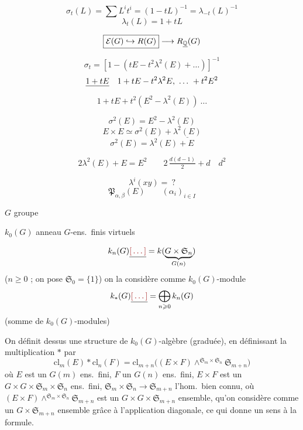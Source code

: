 \documentclass[11pt,a4paper]{article}
\begin{document}
\[
  \sigma_t(L) = \sum L^{i} t^{i} = (1 - tL)^{-1} = \lambda_{-t}(L)^{-1}
\]
\[
  \lambda_t(L) = 1 + tL
\]

\[
  \boxed{\mathcal{E}(G) \hookrightarrow R(G)} \longrightarrow R_{\uncertain{\mathbb{Q}}}(G)
\]

\[
  \sigma_t = [1 - (tE - t^{2}\lambda^{2}(E) + \ldots)]^{-1}
\]
\[
  \struck{1 + tE}\quad 1 + tE - t^{2}\lambda^{2}E, \ \ldots \ + t^{2}E^{2}
\]
\[
  1 + tE + t^{2}(E^{2} - \lambda^{2}(E)) \ \ldots
\]

\[
  \sigma^{2}(E) = E^{2} - \lambda^{2}(E)
\]
\[
  E \times E \simeq \sigma^{2}(E) + \underline{\lambda^{2}(E)}
\]
\[
  \sigma^{2}(E) = \lambda^{2}(E) + E
\]

\[
  \boxed{2\lambda^{2}(E) + E = E^{2}}
  \qquad
  2\,\tfrac{d(d-1)}{2} + d \quad d^{2}
\]

\[
  \lambda^{i}(xy) = \ ?
\]
\[
  \mathfrak{P}_{\alpha, \beta}(E) \qquad (\alpha_i)_{i \in I}
\]

$G$ groupe

$k_0(G)$ anneau   $G$-ens.\ finis virtuels

\struck{\ill{}}

\[
  k_n(G) \struck{\ill{}} = k(\underbrace{G \times \mathfrak{S}_n}_{G(n)})
\]
($n \geqslant 0$ ; on pose $\mathfrak{S}_0 = \{1\}$) on la considère comme
$k_0(G)$-module
\[
  k_*(G) \struck{\ill{}} = \bigoplus_{n \geqslant 0} k_n(G)
\]
(somme de  $k_0(G)$-modules)

On définit dessus une structure de $k_0(G)$-algèbre (graduée), en
définissant la multiplication $*$ par
\[
  \mathrm{cl}_m(E) * \mathrm{cl}_n(F) = \mathrm{cl}_{m+n}\big((E \times F) \wedge^{\mathfrak{S}_m \times \mathfrak{S}_n} \mathfrak{S}_{m+n}\big)
\]
où $E$ est un $G(m)$ ens.\ fini, $F$ un $G(n)$ ens.\ fini, $E \times F$ est
un $G \times G \times \mathfrak{S}_m \times \mathfrak{S}_n$ ens.\ fini,
$\mathfrak{S}_m \times \mathfrak{S}_n \to \mathfrak{S}_{m+n}$ l'hom.\ bien
connu, où $(E \times F) \wedge^{\mathfrak{S}_m \times \mathfrak{S}_n}
\mathfrak{S}_{m+n}$ est un $G \times G \times \mathfrak{S}_{m+n}$ ensemble,
qu'on considère comme un $G \times \mathfrak{S}_{m+n}$ ensemble grâce à
l'application diagonale, ce qui donne un sens à la formule.
\end{document}
